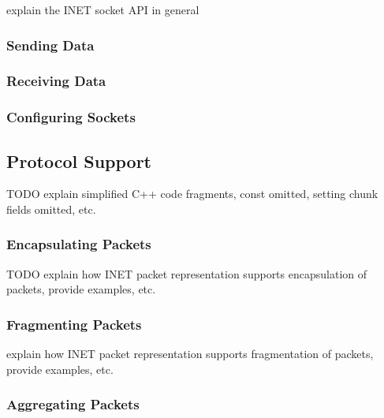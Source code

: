 explain the INET socket API in general



\subsubsection*{Sending Data}

\subsubsection*{Receiving Data}

\subsubsection*{Configuring Sockets}

\subsection{Protocol Support}
\label{subsec:protocol-support}

TODO explain simplified C++ code fragments, const omitted, setting chunk fields omitted, etc.

\subsubsection*{Encapsulating Packets}

TODO explain how INET packet representation supports encapsulation of packets, provide examples, etc.



\subsubsection*{Fragmenting Packets}

explain how INET packet representation supports fragmentation of packets, provide examples, etc.



\subsubsection*{Aggregating Packets}

